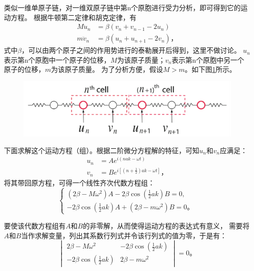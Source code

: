 \documentclass[declarePage]{ecnuthesis}
\begin{document}
类似一维单原子链，对一维双原子链中第n个原胞进行受力分析，即可得到它的运动方程。%
根据牛顿第二定律和胡克定律，有
\begin{align}
    M \ddot{u}_n &= \beta (v_n + v_{n-1} - 2u_n)\\
    m \ddot{v}_n &= \beta (u_n + u_{n+1} - 2v_n) \text{，}
\end{align}
式中$\beta$，可以由两个原子之间的作用势进行的泰勒展开后得到，这里不做讨论。%
$u_n$表示第n个原胞中一个原子的位移，$M$为该原子质量；$v_n$表示第n个原胞中另一个原子的位移，$m$为该原子质量。%
为了分析方便，假设$M>m$。如下图\ref{1DDCEOF}所示。
\begin{figure}[htb]
    \centering
    \includegraphics[width=.7\textwidth]{1DDCEOF.png}
    \label{1DDCEOF}
\end{figure}

下面求解这个运动方程（组）。根据二阶微分方程解的特征，可知$u_n$和$v_n$应满足：
\begin{align}
    u_n &= A e^{i(nak - \omega t)}\\
    v_n &= B e^{i[(n + \frac{1}{2}) ak - \omega t]} \text{，} \label{1DDCEOM}
\end{align}
将其带回原方程，可得一个线性齐次代数方程组：
\begin{equation}
    \begin{cases}
        (2 \beta - M \omega ^2)A-2 \beta \cos (\frac{1}{2}ak)B = 0,\\
        -2\beta\cos (\frac{1}{2}ak)A + (2\beta - m \omega ^2)B = 0 \text{。}
    \end{cases}
\end{equation}

要使该代数方程组有$A$和$B$的非零解，从而使得运动方程的表达式有意义，%
需要将$A$和$B$当作求解变量，列出其系数行列式并令该行列式的值为零，于是有：
\begin{equation}
    \begin{vmatrix}
        2 \beta - M \omega ^2 & -2 \beta \cos (\frac{1}{2}ak)\\
        -2\beta\cos (\frac{1}{2}ak) & 2\beta - m \omega ^2
    \end{vmatrix}
    =0 \text{。}
\end{equation}
\end{document}
